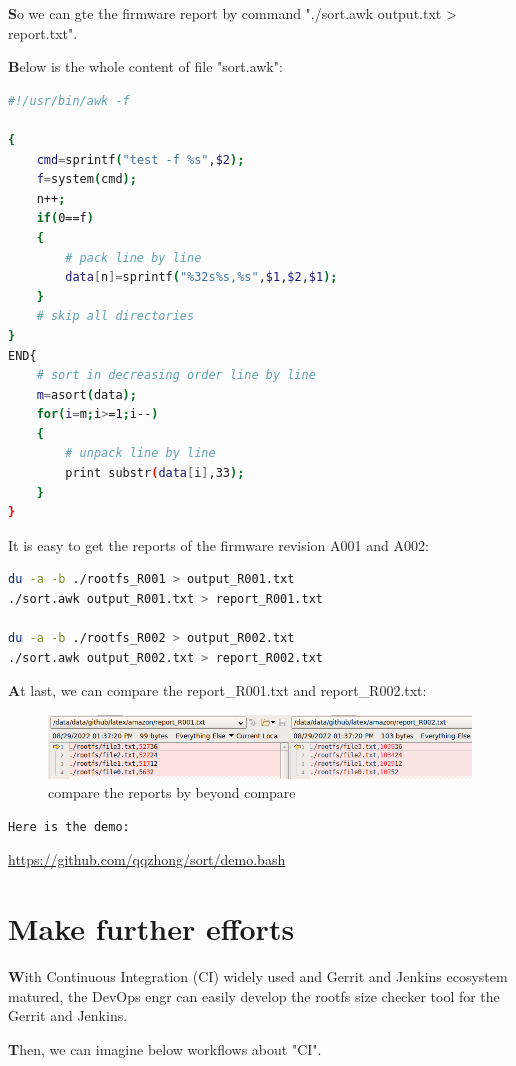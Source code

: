 \documentclass{article}
\begin{document}
\textbf
So we can gte the firmware report by command "./sort.awk output.txt > report.txt".


\textbf
Below is the whole content of file "sort.awk":


\begin{lstlisting}[language={bash}]
#!/usr/bin/awk -f

{
	cmd=sprintf("test -f %s",$2);
	f=system(cmd);
	n++;
	if(0==f)
	{
		# pack line by line
		data[n]=sprintf("%32s%s,%s",$1,$2,$1);
	}
	# skip all directories
}
END{
	# sort in decreasing order line by line
	m=asort(data);
	for(i=m;i>=1;i--)
	{
		# unpack line by line
		print substr(data[i],33);
	}
}
    \end{lstlisting}

It is easy to get the reports of the firmware revision A001 and A002:
\begin{lstlisting}[language={bash}]
du -a -b ./rootfs_R001 > output_R001.txt
./sort.awk output_R001.txt > report_R001.txt

du -a -b ./rootfs_R002 > output_R002.txt
./sort.awk output_R002.txt > report_R002.txt
    \end{lstlisting}


\textbf
At last, we can compare the report\_R001.txt and report\_R002.txt:
\begin{figure}[h]
	\centering
	\includegraphics[scale=0.5]{report.png}
	\caption{compare the reports by beyond compare}
	\label{fig:label}
\end{figure}

\begin{verbatim}
Here is the demo:
\end{verbatim}
\href{https://github.com/qqzhong/sort/demo.bash}{https://github.com/qqzhong/sort/demo.bash}



\section{Make further efforts}

\textbf
With Continuous Integration (CI) widely used and Gerrit and Jenkins ecosystem matured, the DevOps engr can easily develop the rootfs size checker tool for the Gerrit and Jenkins.

\textbf
Then, we can imagine below workflows about "CI".
\end{document}
